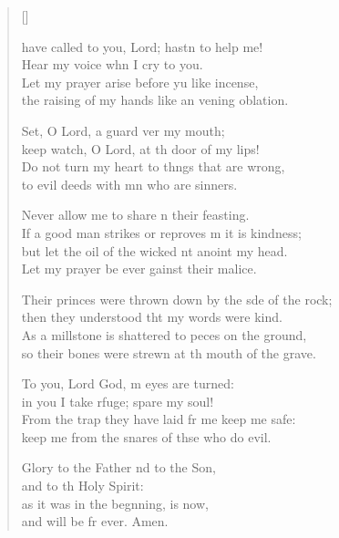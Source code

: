 \settowidth{\versewidth}{Their princes were thrown down by the side of the rock; *}
\begin{verse}[\versewidth]
\begin{patverse}
 have called to you, Lord; hastn to help me!\Med\\
    Hear my voice whn I cry to you.\\
Let my prayer arise before yu like incense,\Med\\
    the raising of my hands like an vening oblation.

Set, O Lord, a guard ver my mouth;\Med\\
    keep watch, O Lord, at th door of my lips!\\
Do not turn my heart to th\pointup{\i}ngs that are wrong,\Med\\
    to evil deeds with mn who are sinners.

Never allow me to share \pointup{\i}n their feasting.\Med\\
    If a good man strikes or reproves m it is kindness;\\
but let the oil of the wicked nt anoint my head.\Med\\
    Let my prayer be ever gainst their malice.

Their princes were thrown down by the s\pointup{\i}de of the rock;\Med\\
    then they understood tht my words were kind.\\
As a millstone is shattered to p\pointup{\i}eces on the ground,\Med\\
    so their bones were strewn at th mouth of the grave.

To you, Lord God, m eyes are turned:\Med\\
    in you I take rfuge; spare my soul!\\
From the trap they have laid fr me keep me safe:\Med\\
    keep me from the snares of thse who do evil.

Glory to the Father nd to the Son,\Med\\
    and to th Holy Spirit:\\
as it was in the beg\pointup{\i}nning, is now,\Med\\
and will be fr ever. Amen.
\end{patverse}
\end{verse}
